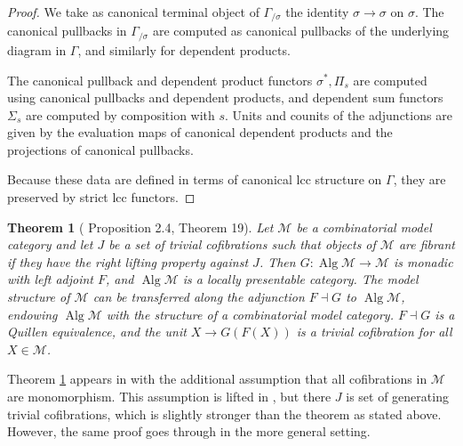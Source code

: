 \documentclass[a4paper]{article}
\newtheorem{theorem}{Theorem}
\theoremstyle{remark}
\theoremstyle{definition}
\begin{document}
\begin{proof}
  We take as canonical terminal object of $\Gamma_{/ \sigma}$ the identity $\sigma \rightarrow \sigma$ on $\sigma$.
  The canonical pullbacks in $\Gamma_{/ \sigma}$ are computed as canonical pullbacks of the underlying diagram in $\Gamma$, and similarly for dependent products. 
  
  The canonical pullback and dependent product functors $\sigma^*, \Pi_s$ are computed using canonical pullbacks and dependent products, and dependent sum functors $\Sigma_s$ are computed by composition with $s$.
  Units and counits of the adjunctions are given by the evaluation maps of canonical dependent products and the projections of canonical pullbacks.

  Because these data are defined in terms of canonical lcc structure on $\Gamma$, they are preserved by strict lcc functors.
\end{proof}

\begin{theorem}[\cite{algebraic-models} Proposition 2.4, \cite{equipping-weak-equivalences} Theorem 19]
  \label{th:algebraically-fibrant-model-category}
  Let $\mathcal{M}$ be a combinatorial model category and let $J$ be a set of trivial cofibrations such that objects of $\mathcal{M}$ are fibrant if they have the right lifting property against $J$.
  Then $G : \operatorname{Alg} \mathcal{M} \rightarrow \mathcal{M}$ is monadic with left adjoint $F$, and $\operatorname{Alg} \mathcal{M}$ is a locally presentable category.
  The model structure of $\mathcal{M}$ can be transferred along the adjunction $F \dashv G$ to $\operatorname{Alg} \mathcal{M}$, endowing $\operatorname{Alg} \mathcal{M}$ with the structure of a combinatorial model category.
  $F \dashv G$ is a Quillen equivalence, and the unit $X \rightarrow G(F(X))$ is a trivial cofibration for all $X \in \mathcal{M}$.
\end{theorem}
Theorem \ref{th:algebraically-fibrant-model-category} appears in \cite{algebraic-models} with the additional assumption that all cofibrations in $\mathcal{M}$ are monomorphism.
This assumption is lifted in \cite{equipping-weak-equivalences}, but there $J$ is set of generating trivial cofibrations, which is slightly stronger than the theorem as stated above.
However, the same proof goes through in the more general setting.
\end{document}
